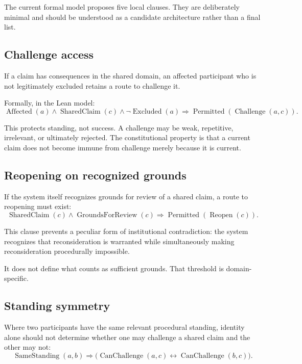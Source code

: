 \documentclass[11pt,a4paper]{article}
\begin{document}
The current formal model proposes five local clauses. They are deliberately minimal and should be understood as a candidate architecture rather than a final list.

\subsection{Challenge access}

If a claim has consequences in the shared domain, an affected participant who is not legitimately excluded retains a route to challenge it.

Formally, in the Lean model:
\[
\operatorname{Affected}(a)
\land
\operatorname{SharedClaim}(c)
\land
\neg\operatorname{Excluded}(a)
\Rightarrow
\operatorname{Permitted}(\operatorname{Challenge}(a,c)).
\]

This protects standing, not success. A challenge may be weak, repetitive, irrelevant, or ultimately rejected. The constitutional property is that a current claim does not become immune from challenge merely because it is current.

\subsection{Reopening on recognized grounds}

If the system itself recognizes grounds for review of a shared claim, a route to reopening must exist:
\[
\operatorname{SharedClaim}(c)
\land
\operatorname{GroundsForReview}(c)
\Rightarrow
\operatorname{Permitted}(\operatorname{Reopen}(c)).
\]

This clause prevents a peculiar form of institutional contradiction: the system recognizes that reconsideration is warranted while simultaneously making reconsideration procedurally impossible.

It does not define what counts as sufficient grounds. That threshold is domain-specific.

\subsection{Standing symmetry}

Where two participants have the same relevant procedural standing, identity alone should not determine whether one may challenge a shared claim and the other may not:
\[
\operatorname{SameStanding}(a,b)
\Rightarrow
\bigl(\operatorname{CanChallenge}(a,c)
\leftrightarrow
\operatorname{CanChallenge}(b,c)\bigr).
\]
\end{document}
